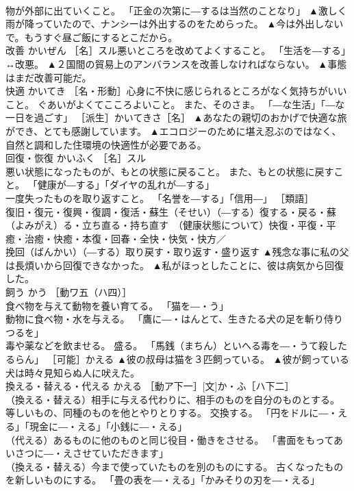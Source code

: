 \documentclass[8pt]{extreport}
\begin{document}
\begin{CJK}{UTF8}{min}
\\	物が外部に出ていくこと。 「正金の次第に―するは当然のことなり」	▲激しく雨が降っていたので、ナンシーは外出するのをためらった。 ▲今は外出しないで。もうすぐ昼ご飯にするとこだから。
\\	改善	かいぜん	［名］スル悪いところを改めてよくすること。 「生活を―する」↔改悪。	▲２国間の貿易上のアンバランスを改善しなければならない。 ▲事態はまだ改善可能だ。
\\	快適	かいてき	［名・形動］心身に不快に感じられるところがなく気持ちがいいこと。 ぐあいがよくてこころよいこと。 また、そのさま。 「―な生活」「―な一日を過ごす」 ［派生］かいてきさ［名］	▲あなたの親切のおかげで快適な旅ができ、とても感謝しています。 ▲エコロジーのために堪え忍ぶのではなく、自然と調和した住環境の快適性が必要である。
\\	回復・恢復	かいふく	［名］スル 
\\	悪い状態になったものが、もとの状態に戻ること。 また、もとの状態に戻すこと。 「健康が―する」「ダイヤの乱れが―する」 
\\	一度失ったものを取り返すこと。 「名誉を―する」「信用―」 ［類語］
\\	復旧・復元・復興・復調・復活・蘇生（そせい）（―する）復する・戻る・蘇（よみがえ）る・立ち直る・持ち直す　（健康状態について）快復・平復・平癒・治癒・快癒・本復・回春・全快・快気・快方／
\\	挽回（ばんかい）（―する）取り戻す・取り返す・盛り返す	▲残念な事に私の父は長煩いから回復できなかった。 ▲私がほっとしたことに、彼は病気から回復した。
\\	飼う	かう	［動ワ五（ハ四）］ 
\\	食べ物を与えて動物を養い育てる。 「猫を―・う」 
\\	動物に食べ物・水を与える。 「鷹に―・はんとて、生きたる犬の足を斬り侍りつるを」 
\\	毒や薬などを飲ませる。 盛る。 「馬銭（まちん）といへる毒を―・うて殺したるらん」 ［可能］かえる	▲彼の叔母は猫を３匹飼っている。 ▲彼が飼っている犬は時々見知らぬ人に吠えた。
\\	換える・替える・代える	かえる	［動ア下一］[文]か・ふ［ハ下二］ 
\\	（換える・替える）相手に与える代わりに、相手のものを自分のものとする。 等しいもの、同種のものを他とやりとりする。 交換する。 「円をドルに―・える」「現金に―・える」「小銭に―・える」 
\\	（代える）あるものに他のものと同じ役目・働きをさせる。 「書面をもってあいさつに―・えさせていただきます」 
\\	（換える・替える）今まで使っていたものを別のものにする。 古くなったものを新しいものにする。 「畳の表を―・える」「かみそりの刃を―・える」 

\end{CJK}
\end{document}
